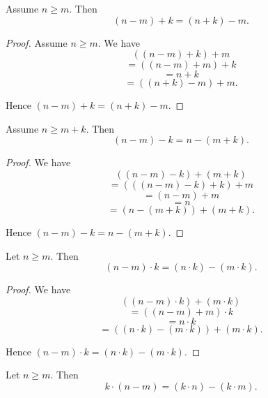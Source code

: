 \documentclass[../../arithmetic.tex]{subfiles}
\begin{document}
\begin{forthel}
    \begin{proposition}\label{Arithmetic_02_07_588928}
      Assume $n \geq m$.
      Then \[(n - m) + k = (n + k) - m. \]
    \end{proposition}
    \begin{proof}
      Assume $n \geq m$.
      We have
      \[   ((n - m) + k) + m \]
      \[ = ((n - m) + m) + k \]
      \[ = n + k \]
      \[ = ((n + k) - m) + m. \]

      Hence $(n - m) + k = (n + k) - m$.
    \end{proof}

    \begin{proposition}\label{Arithmetic_02_07_251141}
      Assume $n \geq m + k$.
      Then \[ (n - m) - k = n - (m + k). \]
    \end{proposition}
    \begin{proof}
      We have
      \[   ((n - m) - k) + (m + k) \]
      \[ = (((n - m) - k) + k) + m \]
      \[ = (n - m) + m \]
      \[ = n \]
      \[ = (n - (m + k)) + (m + k). \]

      Hence $(n - m) - k = n - (m + k)$.
    \end{proof}

    \begin{proposition}\label{Arithmetic_02_07_446298}
      Let $n \geq m$.
      Then \[ (n - m) \cdot k = (n \cdot k) - (m \cdot k). \]
    \end{proposition}
    \begin{proof}
      We have
      \[   ((n - m) \cdot k) + (m \cdot k) \]
      \[ = ((n - m) + m) \cdot k \]
      \[ = n \cdot k \]
      \[ = ((n \cdot k) - (m \cdot k)) + (m \cdot k). \]

      Hence $(n - m) \cdot k = (n \cdot k) - (m \cdot k)$.
    \end{proof}

    \begin{corollary}\label{Arithmetic_02_07_731975}
      Let $n \geq m$.
      Then \[ k \cdot (n - m) = (k \cdot n) - (k \cdot m). \]
    \end{corollary}
  \end{forthel}
\end{document}
